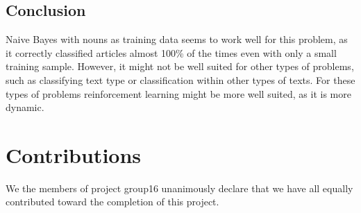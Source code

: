 \documentclass[a4paper,10pt]{article}
\begin{document}
\subsection{Conclusion}

Naive Bayes with nouns as training data seems to work well for this problem, as it correctly classified articles almost 100\% of the times even with only a small training sample. However, it might not be well suited for other types of problems, such as classifying text type or classification within other types of texts\cite{NBpoems}. For these types of problems reinforcement learning might be more well suited, as it is more dynamic.

\section{Contributions}
We the members of project group16 unanimously declare that we have all equally contributed toward the completion of this project.
 
\end{document}
